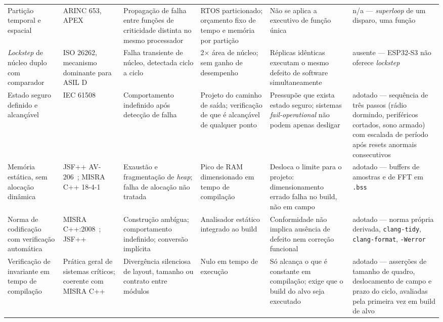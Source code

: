 \documentclass[10pt,a4paper,landscape]{article}
\begin{document}
\begin{table}[!p]
\begin{tabularx}{\textwidth}{@{}Y{0.80}Y{0.80}Y{1.10}Y{0.82}Y{1.26}Y{1.22}@{}}
Partição temporal e espacial &
ARINC 653, APEX~\cite{arinc653} &
Propagação de falha entre funções de criticidade distinta no mesmo processador &
RTOS particionado; orçamento fixo de tempo e memória por partição &
Não se aplica a executivo de função única &
\textsf{n/a} --- \emph{superloop} de um disparo, uma função \\

\emph{Lockstep} de núcleo duplo com comparador &
ISO 26262, mecanismo dominante para ASIL D~\cite{iso26262} &
Falha transiente de núcleo, detectada ciclo a ciclo &
2$\times$ área de núcleo; sem ganho de desempenho &
Réplicas idênticas executam o mesmo defeito de software simultaneamente &
\textsf{ausente} --- ESP32-S3 não oferece \emph{lockstep} \\

Estado seguro definido e alcançável &
IEC 61508~\cite{iec61508} &
Comportamento indefinido após detecção de falha &
Projeto do caminho de saída; verificação de que é alcançável de qualquer ponto &
Pressupõe que exista estado seguro; sistemas \emph{fail-operational} não podem apenas desligar &
\textsf{adotado} --- sequência de três passos (rádio dormindo, periféricos cortados, sono armado) com escalada de período após resets anormais consecutivos \\

Memória estática, sem alocação dinâmica &
JSF++ AV-206~\cite{jsf2005}; MISRA C++ 18-4-1~\cite{misra2008} &
Exaustão e fragmentação de \emph{heap}; falha de alocação não tratada &
Pico de RAM dimensionado em tempo de compilação &
Desloca o limite para o projeto: dimensionamento errado falha no build, não em campo &
\textsf{adotado} --- buffers de amostras e de FFT em \texttt{.bss} \\

Norma de codificação com verificação automática &
MISRA C++:2008~\cite{misra2008}; JSF++~\cite{jsf2005} &
Construção ambígua; comportamento indefinido; conversão implícita &
Analisador estático integrado ao build &
Conformidade não implica ausência de defeito nem correção funcional &
\textsf{adotado} --- norma própria derivada, \texttt{clang-tidy}, \texttt{clang-format}, \texttt{-Werror} \\

Verificação de invariante em tempo de compilação &
Prática geral de sistemas críticos; coerente com MISRA C++~\cite{misra2008} &
Divergência silenciosa de layout, tamanho ou contrato entre módulos &
Nulo em tempo de execução &
Só alcança o que é constante em compilação; exige que o build do alvo seja executado &
\textsf{adotado} --- asserções de tamanho de quadro, deslocamento de campo e prazo do ciclo, avaliadas pela primeira vez em build de alvo \\


\end{tabularx}
\end{table}
\end{document}
